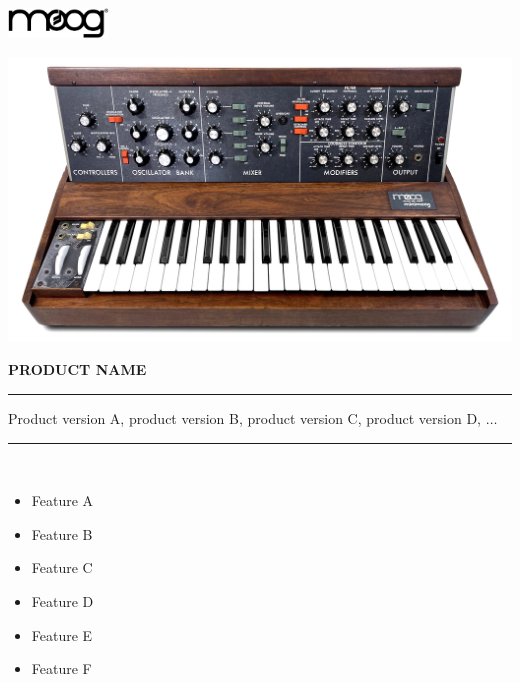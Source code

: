 \documentclass{article}
\begin{document}
\begin{titlepage}
	\begin{flushright}
		\includegraphics[width=0.2\textwidth]{moog_logo}
	\end{flushright}
	\vfil
	\begin{center}
		\includegraphics[width=\textwidth]{minimoog}
	\end{center}
	\vfil
	\Huge
	\textbf{\uppercase{product name}} \\
	\rule{\textwidth}{1pt}
	\Large
	Product version A, product version B, product version C, product version D, $\ldots$\\
	\rule{\textwidth}{1pt}\\[0.5em]
	\begin{minipage}{0.5\textwidth}
		\begin{itemize}
			\item Feature A
			\item Feature B
			\item Feature C
		\end{itemize}
	\end{minipage}
	\hfill
	\begin{minipage}{0.5\textwidth}
		\begin{flushright}
			\begin{itemize}
				\item Feature D
				\item Feature E
				\item Feature F
			\end{itemize}
		\end{flushright}
	\end{minipage}
	\\[0.5em]

\end{titlepage}
\end{document}

